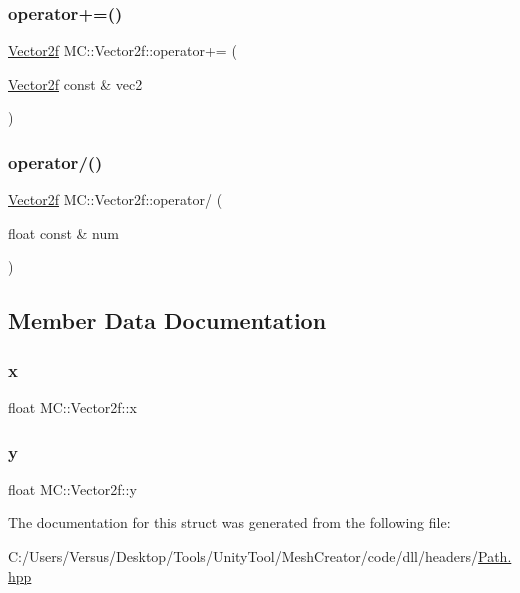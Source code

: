 \subsubsection{\texorpdfstring{operator+=()}{operator+=()}}
{\footnotesize\ttfamily \mbox{\hyperlink{struct_m_c_1_1_vector2f}{Vector2f}} M\+C\+::\+Vector2f\+::operator+= (\begin{DoxyParamCaption}\item[{\mbox{\hyperlink{struct_m_c_1_1_vector2f}{Vector2f}} const \&}]{vec2 }\end{DoxyParamCaption})\hspace{0.3cm}{\ttfamily [inline]}}

\mbox{\label{struct_m_c_1_1_vector2f_aaae7fdbf4fbee90d7b474cb30c09f4b9}} 
\subsubsection{\texorpdfstring{operator/()}{operator/()}}
{\footnotesize\ttfamily \mbox{\hyperlink{struct_m_c_1_1_vector2f}{Vector2f}} M\+C\+::\+Vector2f\+::operator/ (\begin{DoxyParamCaption}\item[{float const \&}]{num }\end{DoxyParamCaption})\hspace{0.3cm}{\ttfamily [inline]}}



\subsection{Member Data Documentation}
\mbox{\label{struct_m_c_1_1_vector2f_ab37720a2995f00ff0d75adf20241f845}} 
\subsubsection{\texorpdfstring{x}{x}}
{\footnotesize\ttfamily float M\+C\+::\+Vector2f\+::x}

\mbox{\label{struct_m_c_1_1_vector2f_ab380af0c672ec08930ea4b8edc800239}} 
\subsubsection{\texorpdfstring{y}{y}}
{\footnotesize\ttfamily float M\+C\+::\+Vector2f\+::y}



The documentation for this struct was generated from the following file\+:\begin{DoxyCompactItemize}
\item 
C\+:/\+Users/\+Versus/\+Desktop/\+Tools/\+Unity\+Tool/\+Mesh\+Creator/code/dll/headers/\mbox{\hyperlink{_path_8hpp}{Path.\+hpp}}\end{DoxyCompactItemize}
